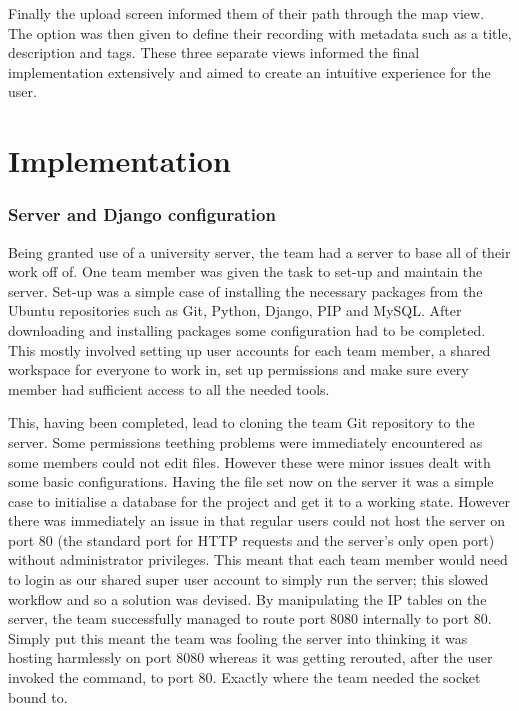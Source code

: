 \documentclass{l3proj}
\begin{document}
Finally the upload screen informed them of their path through the map view. The option was then given to define their recording with metadata such as a title, description and tags. These three separate views informed the final implementation extensively and aimed to create an intuitive experience for the user.
\chapter{Implementation}
\label{impl}

\subsection{Server and Django configuration}
Being granted use of a university server, the team had a server to base all of their work off of. One team member was given the task to set-up and maintain the server.
Set-up was a simple case of installing the necessary packages from the \gls{Ubuntu} repositories such as Git, Python, Django, \gls{PIP} and \gls{MySQL}. After downloading and installing packages some configuration had to be completed. This mostly involved setting up user accounts for each team member, a shared workspace for everyone to work in, set up permissions and make sure every member had sufficient access to all the needed tools.

This, having been completed, lead to cloning the team Git repository to the server. Some permissions teething problems were immediately encountered as some members could not edit files. However these were minor issues dealt with some basic configurations.
Having the file set now on the server it was a simple case to initialise a database for the project and get it to a working state. However there was immediately an issue in that regular users could not host the server on port 80 (the standard port for HTTP requests and the server's only open port) without administrator privileges. This meant that each team member would need to login as our shared super user account to simply run the server; this slowed workflow and so a solution was devised. By manipulating the IP tables on the server, the team successfully managed to route port 8080 internally to port 80. Simply put this meant the team was fooling the server into thinking it was hosting harmlessly on port 8080 whereas it was getting rerouted, after the user invoked the command, to port 80. Exactly where the team needed the socket bound to.
\end{document}
